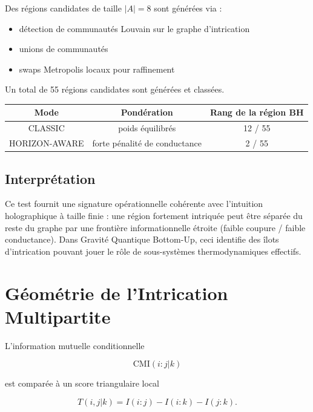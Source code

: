 \documentclass[11pt]{article}
\begin{document}
Des régions candidates de taille $|A|=8$ sont générées via :

\begin{itemize}
\item détection de communautés Louvain sur le graphe d'intrication
\item unions de communautés
\item swaps Metropolis locaux pour raffinement
\end{itemize}

Un total de 55 régions candidates sont générées et classées.

\begin{center}
\begin{tabular}{ccc}
\toprule
Mode & Pondération & Rang de la région BH \\
\midrule
CLASSIC & poids équilibrés & 12 / 55 \\
HORIZON-AWARE & forte pénalité de conductance & 2 / 55 \\
\bottomrule
\end{tabular}
\end{center}

\subsection{Interprétation}

Ce test fournit une signature opérationnelle cohérente avec l'intuition holographique à taille finie : une région fortement intriquée peut être séparée du reste du graphe par une frontière informationnelle étroite (faible coupure / faible conductance). Dans Gravité Quantique Bottom-Up, ceci identifie des îlots d'intrication pouvant jouer le rôle de sous-systèmes thermodynamiques effectifs.


\section{Géométrie de l'Intrication Multipartite}

L'information mutuelle conditionnelle

\[
\mathrm{CMI}(i:j|k)
\]

est comparée à un score triangulaire local

\[
T(i,j|k)=I(i:j)-I(i:k)-I(j:k).
\]
\end{document}
